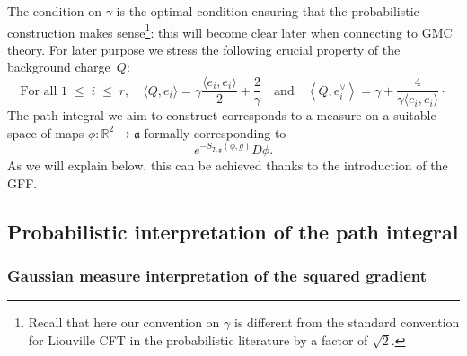 \documentclass[10pt]{amsart}
\theoremstyle{definition}\newtheorem{defi}[theo]{Definition}\newtheorem{rema}[theo]{Remark}\newtheorem{exam}[theo]{Example}\newtheorem{exem}[theo]{Example}\newtheorem{nota}[theo]{Notation}
\renewcommand{\leq}{\;\leqslant\;}
\newcommand{\frkg}{\mathfrak{g}}
\newcommand{\frka}{\mathfrak{a}}
\newcommand{\R}{\mathbb{R}}
\newcommand{\ps}[1]{\langle #1 \rangle}
\begin{document}
The condition on $\gamma$ is the optimal condition ensuring that the probabilistic construction makes sense\footnote{Recall that here our convention on $\gamma$ is different from the standard convention for Liouville CFT in the probabilistic literature by a factor of $\sqrt{2}$.}: this will become clear later when connecting to GMC theory. For later purpose we stress the following crucial property of the background charge~$Q$:
\begin{equation}\label{eq:propQ}
\text{For all } 1 \leq i \leq r,\quad \langle Q, e_i \rangle =\gamma\frac{\ps{e_i,e_i}}{2}+\frac{2}{\gamma}\quad\text{and}\quad\left\langle Q, e_i^\vee \right\rangle =\gamma+\frac{4}{\gamma\ps{e_i,e_i}}\cdot
\end{equation}
The path integral we aim to construct corresponds to a measure on a suitable space of maps $\phi: \R^2\to \frka$ formally corresponding to
\begin{equation}\label{TQFTPI}
e^{- S_{T,\frkg}(\phi,g)}D\phi.
\end{equation}
As we will explain below, this can be achieved thanks to the introduction of the GFF.

\subsection{Probabilistic interpretation of the path integral}


\subsubsection{Gaussian measure interpretation of the squared gradient}
\end{document}
